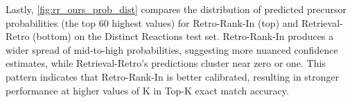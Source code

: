 Lastly, \cref{fig:rr_ours_prob_dist} compares the distribution of predicted precursor probabilities (the top 60 highest values) for Retro-Rank-In (top) and Retrieval-Retro (bottom) on the Distinct Reactions test set. Retro-Rank-In produces a wider spread of mid-to-high probabilities, suggesting more nuanced confidence estimates, while Retrieval-Retro’s predictions cluster near zero or one. This pattern indicates that Retro-Rank-In is better calibrated, resulting in stronger performance at higher values of K in Top-K exact match accuracy.




